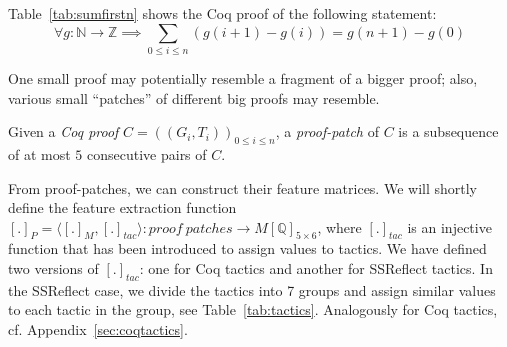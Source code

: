 \begin{example}\label{example0}
Table~\ref{tab:sumfirstn} shows the Coq proof of the following statement:
 $$\forall g:\mathbb{N} \rightarrow \mathbb{Z}\implies \sum_{0\leq i \leq n} (g(i+1) - g(i)) = g(n+1) - g(0)$$
\end{example}

One small proof may potentially 
resemble a fragment of a bigger proof; also, various small ``patches'' of different big proofs may resemble. 

\begin{definition}
 Given a \emph{Coq proof} $C=((G_i,T_i))_{0\leq i\leq n}$, a \emph{proof-patch} of $C$ is a subsequence of at most $5$ consecutive 
 pairs of $C$.
\end{definition}

From proof-patches, we can construct their feature matrices. %
We will shortly define the feature extraction function $[.]_P=\langle[.]_M,[.]_{tac}\rangle : proof~patches \rightarrow M[\mathbb{Q}]_{5\times 6}$,
where $[.]_{tac}$ is an injective function that has been introduced to assign values to tactics.
We have defined two versions of  $[.]_{tac}$: one for Coq tactics and another for SSReflect tactics. 
In the SSReflect case, we divide the tactics into 7 groups and assign similar
values to each tactic in the group, see Table~\ref{tab:tactics}. 
Analogously for Coq tactics, cf. Appendix~\ref{sec:coqtactics}.





